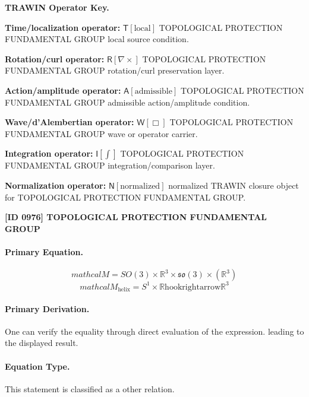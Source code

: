 \par\vspace{0.45\baselineskip}
\noindent\begin{minipage}[t]{\linewidth}
\begingroup
\small
\raggedright
\textbf{TRAWIN Operator Key.}\par
\noindent\textbf{Time/localization operator:} $\mathsf{T}\!\left[\mathrm{local}\right]$ TOPOLOGICAL PROTECTION FUNDAMENTAL GROUP local source condition.\par
\noindent\textbf{Rotation/curl operator:} $\mathsf{R}\!\left[\nabla\times\right]$ TOPOLOGICAL PROTECTION FUNDAMENTAL GROUP rotation/curl preservation layer.\par
\noindent\textbf{Action/amplitude operator:} $\mathsf{A}\!\left[\mathrm{admissible}\right]$ TOPOLOGICAL PROTECTION FUNDAMENTAL GROUP admissible action/amplitude condition.\par
\noindent\textbf{Wave/d'Alembertian operator:} $\mathsf{W}\!\left[\Box\right]$ TOPOLOGICAL PROTECTION FUNDAMENTAL GROUP wave or operator carrier.\par
\noindent\textbf{Integration operator:} $\mathsf{I}\!\left[\int\right]$ TOPOLOGICAL PROTECTION FUNDAMENTAL GROUP integration/comparison layer.\par
\noindent\textbf{Normalization operator:} $\mathsf{N}\!\left[\mathrm{normalized}\right]$ normalized TRAWIN closure object for TOPOLOGICAL PROTECTION FUNDAMENTAL GROUP.\par
\endgroup
\end{minipage}

\clearpage
\noindent\textbf{[ID 0976] TOPOLOGICAL PROTECTION FUNDAMENTAL GROUP}\par
\vspace{0.35em}
\paragraph{Primary Equation.}
\[
mathcal{M}=SO(3)\times\mathbb{R}^{3}\times\mathfrak{so}(3)^{ }\times(\mathbb{R}^{3})^{ }
\]
\[
mathcal{M}_{\mathrm{helix}} = S^{1} \times \mathbb{R} \mathrm{hookrightarrow} \mathbb{R}^{3}
\]

\paragraph{Primary Derivation.}
One can verify the equality through direct evaluation of the expression. leading to the displayed result.
\paragraph{Equation Type.}
This statement is classified as a other relation.

